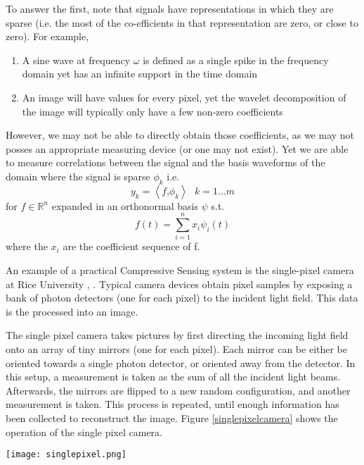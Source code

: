 To answer the first, note that signals have representations in which they are sparse (i.e. the most of the co-efficients in that representation are zero, or close to zero). For example, 

\begin{enumerate}
\item  A sine wave at frequency \(\omega\) is defined as a single spike in the frequency domain yet has an infinite support in the time domain
\item An image will have values for every pixel, yet the wavelet decomposition of the image will typically only have a few non-zero coefficients
\end{enumerate} 

However, we may not be able to directly obtain those coefficients, as we may not posses an appropriate measuring device (or one may not exist). Yet we are able to measure correlations between the signal and the basis waveforms of the domain where the signal is sparse \(\phi_{k}\) i.e. 
%
\begin{equation}
y_{k} = \left\langle f \text{,} \phi_{k} \right\rangle \text{ } k = 1 \ldots m
\end{equation}
%
for \( f \in \mathbb{R}^n \) expanded in an orthonormal basis \( \psi \) s.t.
%
\begin{equation}
f(t) = \sum_{i = 1}^n x_{i}\psi_{i}(t) 
\end{equation}
%
where the \(x_{i} \) are the coefficient sequence of f. 

An example of a practical Compressive Sensing system is the single-pixel camera at Rice University \cite{Duarte2008}, \cite{wakin2006architecture}. Typical camera devices obtain pixel samples by exposing a bank of photon detectors (one for each pixel) to the incident light field. This data is the processed into an image.

The single pixel camera takes pictures by first directing the incoming light field onto an array of tiny mirrors (one for each pixel). Each mirror can be either be oriented towards a single photon detector, or oriented away from the detector. In this setup, a measurement is taken as the sum of all the incident light beams. Afterwards, the mirrors are flipped to a new random configuration, and another measurement is taken. This process is repeated, until enough information has been collected to reconstruct the image. Figure \ref{singlepixelcamera} shows the operation of the single pixel camera.

\begin{figure*}[h]
\centering
\texttt{[image: singlepixel.png]}
\caption{The operation of the single pixel camera at Rice University \cite{Thompson2011}, \cite{DavenportSinglePixel}}
\label{singlepixelcamera}
\end{figure*}

